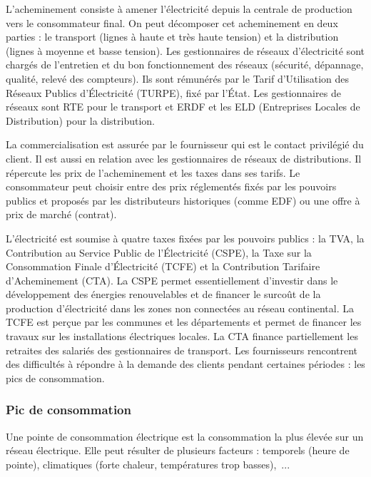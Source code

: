 			L'acheminement consiste à amener l'électricité depuis la centrale de production vers le consommateur final. On peut décomposer cet acheminement en deux parties : le transport (lignes à haute et très haute tension) et la distribution (lignes à moyenne et basse tension). Les gestionnaires de réseaux d'électricité sont chargés de l'entretien et du bon fonctionnement des réseaux (sécurité, dépannage, qualité, relevé des compteurs). Ils sont rémunérés par le Tarif d'Utilisation des Réseaux Publics d'Électricité (TURPE), fixé par l'État. Les gestionnaires de réseaux sont RTE pour le transport et ERDF et les ELD (Entreprises Locales de Distribution) pour la distribution.
			
			La commercialisation est assurée par le fournisseur qui est le contact privilégié du client. Il est aussi en relation avec les gestionnaires de réseaux de distributions. Il répercute les prix de l'acheminement et les taxes dans ses tarifs. Le consommateur peut choisir entre des prix réglementés fixés par les pouvoirs publics et proposés par les distributeurs historiques (comme EDF) ou une offre à prix de marché (contrat).
			
			L'électricité est soumise à quatre taxes fixées par les pouvoirs publics : la TVA, la Contribution au Service Public de l'Électricité (CSPE), la Taxe sur la Consommation Finale d'Électricité (TCFE) et la Contribution Tarifaire d'Acheminement (CTA). La CSPE permet essentiellement d'investir dans le développement des énergies renouvelables et de financer le surcoût de la production d'électricité dans les zones non connectées au réseau continental. La TCFE est perçue par les communes et les départements et permet de financer les travaux sur les installations électriques locales. La CTA finance partiellement les retraites des salariés des gestionnaires de transport.
			Les fournisseurs rencontrent des difficultés à répondre à la demande des clients pendant certaines périodes : les pics de consommation.
		
		
		\subsubsection{Pic de consommation}
			Une pointe de consommation électrique est la consommation la plus élevée sur un réseau électrique. Elle peut résulter de plusieurs facteurs : temporels (heure de pointe), climatiques (forte chaleur, températures trop basses),~...
			
